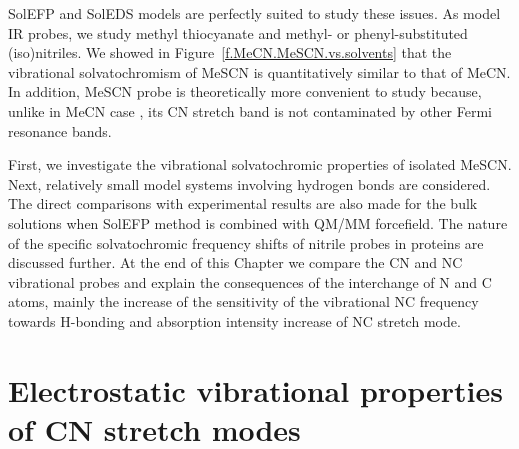 \documentclass[a4paper,titlepage,twoside,fleqn,12pt]{book}
\begin{document}
\begin{refsection}
SolEFP and SolEDS models are
perfectly suited to study these issues. As model 
IR probes, we study methyl thiocyanate and methyl\hyp{} 
or phenyl\hyp{}substituted (iso)nitriles.
We showed in Figure~\ref{f.MeCN.MeSCN.vs.solvents} 
that the vibrational solvatochromism of MeSCN is
quantitatively similar to that of MeCN. In addition, 
MeSCN probe is theoretically more convenient to study
because, unlike in MeCN case \citep{Suzuki.Nakagawa.Fujiyama.SCActaA.1977}, 
its CN stretch band is not
contaminated by other Fermi resonance bands.

First, we investigate
the vibrational solvatochromic properties of isolated
MeSCN. Next, relatively small model systems
involving hydrogen bonds are considered. The direct
comparisons with experimental results are also made for the bulk
solutions when SolEFP method is combined with QM/MM forcefield. 
The nature of the specific
solvatochromic frequency shifts of nitrile probes in proteins
are discussed further. At the end of this Chapter we compare
the CN and NC vibrational probes and explain the consequences of the 
interchange of N and C atoms, mainly the increase of the sensitivity
of the vibrational NC frequency
towards H-bonding and absorption intensity increase of NC stretch mode.

\section{Electrostatic vibrational properties of CN stretch modes}


\end{refsection}
\end{document}
